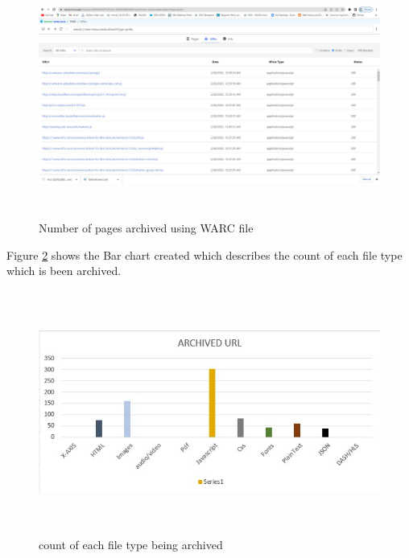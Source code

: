 \documentclass[12pt]{article}
\begin{document}
\begin{figure}[h]
    \centering
    \includegraphics[trim=0 0 0 0, clip, width=\textwidth,height=8cm] {replay-web.jpg}
    \caption{Number of pages archived using WARC file}
    \label{fig:Conifer}
 \end{figure}
 
Figure \ref{fig:archived url} shows the Bar chart created which describes the count of each file type which is been archived.

\begin{figure}[!b]
    \centering
    \includegraphics[trim=0 0 0 0, clip, width=\textwidth,height=8cm] {ARCHIVED-URL.JPG}
    \caption{count of each file type being archived}
    \label{fig:archived url}
\end{figure}
\end{document}
